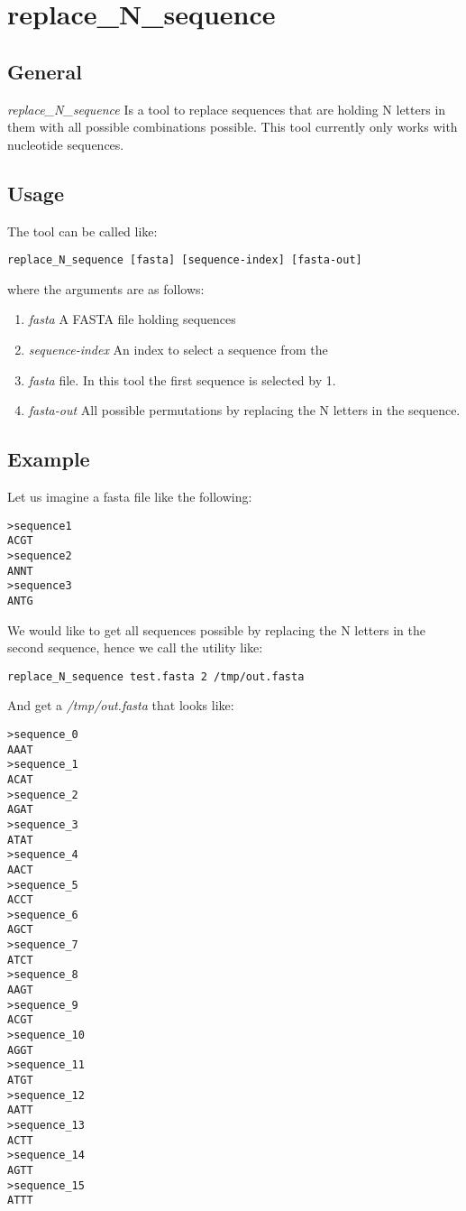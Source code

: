 \section{replace\_N\_sequence}


\subsection{General}

\emph{replace\_N\_sequence} Is a tool to replace sequences that are
holding N letters in them with all possible combinations
possible. This tool currently only works with nucleotide sequences.

\subsection{Usage}

The tool can be called like:
\begin{lstlisting}
replace_N_sequence [fasta] [sequence-index] [fasta-out]
\end{lstlisting}
where the arguments are as follows:
\begin{enumerate}
\item \emph{fasta} A FASTA file holding sequences
\item \emph{sequence-index} An index to select a sequence from the
\item \emph{fasta} file. In this tool the first sequence is selected by
  1.
\item \emph{fasta-out} All possible permutations by replacing the N
  letters in the sequence.
\end{enumerate}

\subsection{Example}
Let us imagine a fasta file like the following:
\begin{lstlisting}
>sequence1
ACGT
>sequence2
ANNT
>sequence3
ANTG
\end{lstlisting}
We would like to get all sequences possible by replacing the N letters
in the second sequence, hence we call the utility like:
\begin{lstlisting}
replace_N_sequence test.fasta 2 /tmp/out.fasta
\end{lstlisting}
And get a \emph{/tmp/out.fasta} that looks like:
\begin{lstlisting}
>sequence_0
AAAT
>sequence_1
ACAT
>sequence_2
AGAT
>sequence_3
ATAT
>sequence_4
AACT
>sequence_5
ACCT
>sequence_6
AGCT
>sequence_7
ATCT
>sequence_8
AAGT
>sequence_9
ACGT
>sequence_10
AGGT
>sequence_11
ATGT
>sequence_12
AATT
>sequence_13
ACTT
>sequence_14
AGTT
>sequence_15
ATTT
\end{lstlisting}

